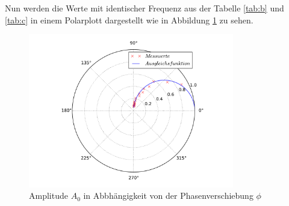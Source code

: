 \newpage
Nun werden die Werte mit identischer Frequenz
aus der Tabelle \ref{tab:b} und \ref{tab:c} in einem
Polarplott dargestellt wie in Abbildung \ref{abb:d} zu sehen.
\begin{figure}
\centering
\includegraphics[width=0.8\textwidth]{d.pdf}
\caption{Amplitude $A_0$ in Abbhängigkeit von der Phasenverschiebung $\phi$ }
\label{abb:d}
\end{figure}
\FloatBarrier
